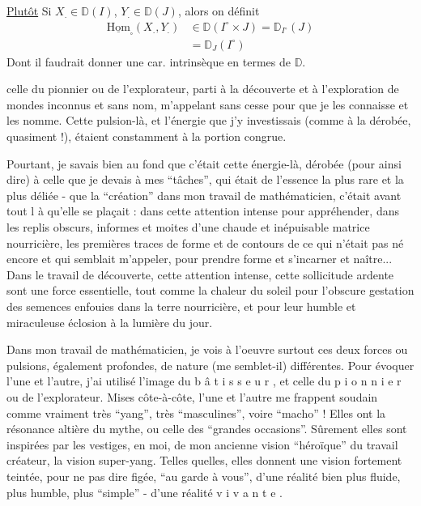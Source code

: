 \uline{Plutôt} Si $X_{.}\in\mathbb{D}(I)$, $Y_{.}\in\mathbb{D}(J)$, alors on définit
\[
\begin{aligned}
\underline{\mathrm{Hom}}_{\square}(X_{.},Y_{.})&\in\mathbb{D}(I^\circ\times J)=\mathbb{D}_{I^\circ}(J)\\
&=\mathbb{D}_J(I^\circ)
\end{aligned}
\]
Dont il faudrait donner une car. intrinsèque en termes de $\mathbb{D}$. 

celle du pionnier ou de l'explorateur, parti à la découverte et à l'exploration de mondes inconnus et sans nom, m'appelant sans cesse pour que je les connaisse et les nomme. Cette pulsion-là, et l'énergie que j'y investissais (comme à la dérobée, quasiment !), étaient constamment à la portion congrue.

Pourtant, je savais bien au fond que c'était cette énergie-là, dérobée (pour ainsi dire) à celle que je devais à mes ``tâches'', qui était de l'essence la plus rare et la plus déliée - que la ``création'' dans mon travail de mathématicien, c'était avant tout l à qu'elle se plaçait : dans cette attention intense pour appréhender, dans les replis obscurs, informes et moites d'une chaude et inépuisable matrice nourricière, les premières traces de forme et de contours de ce qui n'était pas né encore et qui semblait m'appeler, pour prendre forme et s'incarner et naître... Dans le travail de découverte, cette attention intense, cette sollicitude ardente sont une force essentielle, tout comme la chaleur du soleil pour l'obscure gestation des semences enfouies dans la terre nourricière, et pour leur humble et miraculeuse éclosion à la lumière du jour.

Dans mon travail de mathématicien, je vois à l'oeuvre surtout ces deux forces ou pulsions, également profondes, de nature (me semble\unsure{-{}-|-}t-il) différentes. Pour évoquer l'une et l'autre, j'ai utilisé l'image du b â t i s s e u r , et celle du p i o n n i e r ou de l'explorateur. Mises côte-à-côte, l'une et l'autre me frappent soudain comme vraiment très ``yang'', très ``masculines'', voire ``macho'' ! Elles ont la résonance altière du mythe, ou celle des ``grandes occasions''. Sûrement elles sont inspirées par les vestiges, en moi, de mon ancienne vision ``héroïque'' du travail créateur, la vision super-yang. Telles quelles, elles donnent une vision fortement teintée, pour ne pas dire figée, ``au garde à vous'', d'une réalité bien plus fluide, plus humble, plus ``simple'' - d'une réalité v i v a n t e .

